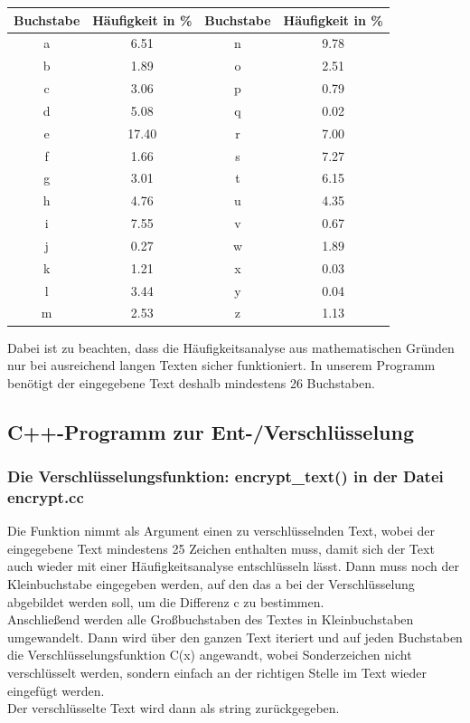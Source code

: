 \documentclass[ngerman,12pt]{article}
\begin{document}
\begin{table}[ht]
	\centering
	\label{table:hfverteilung}
\begin{tabular}{*{4}{|c}|}
	\hline
	\textbf{Buchstabe} & \textbf{Häufigkeit in \%} & \textbf{Buchstabe} & \textbf{Häufigkeit in \%}\\
	\hline
	a & 6.51 & n & 9.78\\
	\hline
	b & 1.89 & o & 2.51\\
	\hline
	c & 3.06 & p & 0.79\\
	\hline
	d & 5.08 & q & 0.02\\
	\hline
	e & 17.40 & r& 7.00\\
	\hline
	f & 1.66 & s & 7.27\\
	\hline
	g & 3.01 & t & 6.15\\
	\hline
	h & 4.76 & u & 4.35\\
	\hline
	i & 7.55 & v & 0.67\\
	\hline
	j & 0.27 & w & 1.89\\
	\hline
	k & 1.21 & x & 0.03\\
	\hline
	l & 3.44 & y & 0.04\\
	\hline
	m & 2.53 & z & 1.13\\
	\hline
\end{tabular}
\end{table}
Dabei ist zu beachten, dass die Häufigkeitsanalyse aus mathematischen Gründen nur bei ausreichend langen Texten sicher funktioniert. In unserem Programm benötigt der eingegebene Text deshalb mindestens 26 Buchstaben.

\newpage

\subsection*{C++-Programm zur Ent-/Verschlüsselung}

\subsubsection*{Die Verschlüsselungsfunktion: encrypt\_text() in der Datei encrypt.cc}

Die Funktion nimmt als Argument einen zu verschlüsselnden Text, wobei der eingegebene Text mindestens 25 Zeichen enthalten muss, damit sich der Text auch wieder mit einer Häufigkeitsanalyse entschlüsseln lässt. Dann muss noch der Kleinbuchstabe eingegeben werden, auf den das a bei der Verschlüsselung abgebildet werden soll, um die Differenz c zu bestimmen. \\
Anschließend werden alle Großbuchstaben des Textes in Kleinbuchstaben umgewandelt. Dann wird über den ganzen Text iteriert und auf jeden Buchstaben die Verschlüsselungsfunktion C(x) angewandt, wobei Sonderzeichen nicht verschlüsselt werden, sondern einfach an der richtigen Stelle im Text wieder eingefügt werden. \\
Der verschlüsselte Text wird dann als string zurückgegeben.
\end{document}
